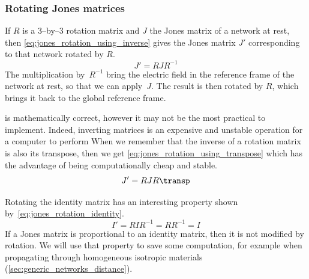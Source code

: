 \subsubsection{Rotating Jones matrices}
\label{sec:rotating_jones_matrices}
If $R$ is a 3--by--3 rotation matrix and $J$ the Jones matrix of a network at rest,
then \cref{eq:jones_rotation_using_inverse} gives the Jones matrix $J'$ corresponding to that network rotated by $R$.
\begin{equation}
    J' = R J R^{-1}
    \label{eq:jones_rotation_using_inverse}
\end{equation}
The multiplication by~$R^{-1}$ bring the electric field in the reference frame of the network at rest, so that we can apply~$J$.
The result is then rotated by $R$, which brings it back to the global reference frame.

 is mathematically correct, however it may not be the most practical to implement.
Indeed, inverting matrices is an expensive and unstable operation for a computer to perform
When we remember that the inverse of a rotation matrix is also its transpose,
then we get \cref{eq:jones_rotation_using_transpose} which has the advantage of being computationally cheap and stable.
\begin{equation}
    J' = R J R\transp
    \label{eq:jones_rotation_using_transpose}
\end{equation}

Rotating the identity matrix has an interesting property shown by~\eqref{eq:jones_rotation_identity}.
\begin{equation}
    I' = R I R^{-1}
       = R R^{-1}
       = I
    \label{eq:jones_rotation_identity}
\end{equation}
If a Jones matrix is proportional to an identity matrix, then it is not modified by rotation.
We will use that property to save some computation, for example when propagating through homogeneous isotropic materials (\vref{sec:generic_networks_distance}).



